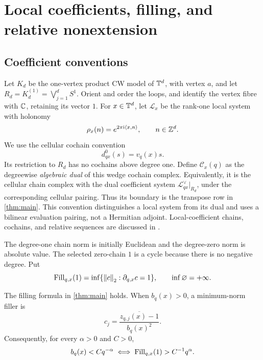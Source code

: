 \documentclass[11pt,a4paper]{article}
\begin{document}
\section{Local coefficients, filling, and relative nonextension}
\label{sec:local}

\subsection{Coefficient conventions}

Let $K_d$ be the one-vertex product CW model of $\mathbb T^d$, with vertex $a$,
and let $R_d=K_d^{(1)}=\bigvee_{j=1}^d S^1$.  Orient and order the loops,
and identify the vertex fibre with $\mathbb C$, retaining its vector $1$.
For $x\in\mathbb T^d$, let $\mathcal L_x$ be the rank-one local system with
holonomy
\[
 \rho_x(n)=e^{2\pi\mathrm i\langle x,n\rangle},\qquad n\in\mathbb Z^d.
\]
We use the cellular cochain convention
\begin{equation}\label{eq:coboundary}
 d^0_{qx}(s)=v_q(x)s.
\end{equation}
Its restriction to $R_d$ has no cochains above degree one.  Define
$\mathcal C_x(q)$ as the degreewise \emph{algebraic dual} of this wedge
cochain complex.  Equivalently, it is the cellular chain complex with the
dual coefficient system $\mathcal L_{qx}^{\vee}|_{R_d}$, under the
corresponding cellular pairing.  Thus its boundary is the transpose row
in \cref{thm:main}.  This convention distinguishes a local system from its
dual and uses a bilinear evaluation pairing, not a Hermitian adjoint.
Local-coefficient chains, cochains, and relative sequences are discussed in
\cite[Section 3.H]{hatcher}.

The degree-one chain norm is initially Euclidean and the degree-zero norm
is absolute value.  The selected zero-chain $1$ is a cycle because there
is no negative degree.  Put
\begin{equation}\label{eq:filling-definition}
 \operatorname{Fill}_{q,x}(1)=\inf\{\left\lVert c\right\rVert_2:\partial_{q,x}c=1\},
 \qquad \inf\varnothing=+\infty.
\end{equation}

\begin{proposition}\label{prop:filling}
The filling formula in \cref{thm:main} holds.  When $b_q(x)>0$, a
minimum-norm filler is
\[
 c_j=\frac{\overline{z_{q,j}(x)-1}}{b_q(x)^2}.
\]
Consequently, for every $\alpha>0$ and $C>0$,
\begin{equation}\label{eq:cost-threshold}
 b_q(x)<Cq^{-\alpha}
 \iff \operatorname{Fill}_{q,x}(1)>C^{-1}q^{\alpha}.
\end{equation}
\end{proposition}
\end{document}
